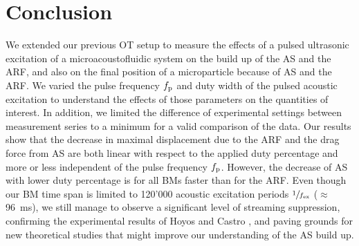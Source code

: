 \section{Conclusion}
We extended our previous OT setup to measure the effects of a pulsed ultrasonic 
excitation of a microacoustofluidic system on the build up of the AS and the 
ARF, and also on the final position of a microparticle because of AS and the 
ARF. We varied the pulse frequency $f_{\mathrm{p}}$ and duty width of the pulsed acoustic 
excitation to understand the effects of those parameters on the quantities of 
interest. In addition, we limited the difference of experimental settings 
between measurement series to a minimum for a valid comparison of the data. Our 
results show that the decrease in maximal displacement due to the ARF and the 
drag force from AS are both linear with respect to the applied duty percentage 
and more or less independent of the pulse frequency $f_{\mathrm{p}}$. However, the 
decrease of AS with lower duty percentage is for all BMs faster than for the 
ARF. Even though our BM time span is limited to 120'000 acoustic excitation 
periods $\sfrac{1}{f_{\mathrm{ex}}}$ ($\approx$ \SI{96}{\ms}), we still manage to observe 
a significant level of streaming suppression, confirming the experimental 
results of Hoyos and Castro \cite{Castro2016,Hoyos2013}, and paving grounds for 
new theoretical studies that might improve our understanding of the AS build 
up.


